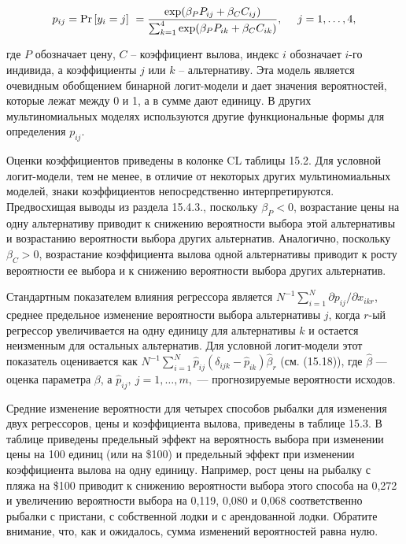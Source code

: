 \[p_{ij}={\Pr  \left[y_i=j\right]\ }=
\frac{{\rm exp} ({\beta }_PP_{ij}+{\beta }_CC_{ij})}{\sum^4_{k=1}{{\rm exp} ({\beta }_PP_{ik}+{\beta }_CC_{ik})}},\ \ \ \ j=1,\dots ,4,\] 

где $P$ обозначает цену, $C$ -- коэффициент вылова, индекс $i$ обозначает $i$-го индивида, а коэффициенты $j$ или $k$ -- альтернативу. Эта модель является очевидным обобщением бинарной логит-модели и дает значения вероятностей, которые лежат между 0 и 1, а в сумме дают единицу. В других мультиномиальных моделях используются другие функциональные формы для определения $p_{ij}$.

Оценки коэффициентов приведены в колонке CL таблицы 15.2. Для условной логит-модели, тем не менее, в отличие от некоторых других мультиномиальных моделей, знаки коэффициентов непосредственно интерпретируются. Предвосхищая выводы из раздела 15.4.3., поскольку ${\beta }_P< 0$,  возрастание цены на одну альтернативу приводит к снижению вероятности выбора этой альтернативы и возрастанию вероятности выбора других альтернатив. Аналогично, поскольку ${\beta }_C>0$, возрастание коэффициента вылова одной альтернативы приводит к росту вероятности ее выбора и к снижению вероятности выбора других альтернатив.



Стандартным показателем влияния регрессора является $N^{-1}\sum^N_{i=1}{{\partial p_{ij}}/{\partial x_{ikr}}}$, среднее предельное изменение вероятности выбора альтернативы $j$, когда $r$-ый регрессор увеличивается на одну единицу для альтернативы $k$ и остается неизменным для остальных альтернатив. Для условной логит-модели этот показатель оценивается как $N^{-1}\sum^N_{i=1}{{\hat{p}}_{ij}\left({\delta }_{ijk}-{\hat{p}}_{ik}\right){\widehat{\beta }}_r}$ (см. (15.18)), где $\widehat{\beta }$ --- оценка параметра $\beta $, а ${\hat{p}}_{ij},\ j=1,\dots ,m,$ --- прогнозируемые вероятности исходов.

Средние изменение вероятности для четырех способов рыбалки для изменения двух регрессоров, цены и коэффициента вылова, приведены в таблице 15.3. В таблице приведены предельный эффект на вероятность выбора при изменении цены на 100 единиц (или на \$100) и предельный эффект при изменении  коэффициента вылова на одну единицу. Например, рост цены на рыбалку с пляжа на \$100 приводит к снижению вероятности выбора этого способа на 0,272 и увеличению вероятности выбора на 0,119, 0,080 и 0,068 соответственно рыбалки с пристани, с собственной лодки и с арендованной лодки. Обратите внимание, что, как и ожидалось, сумма изменений вероятностей равна нулю.

